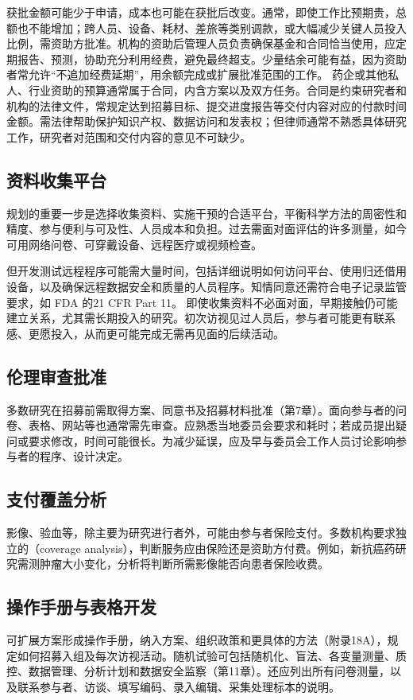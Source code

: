 获批金额可能少于申请，成本也可能在获批后改变。通常，即使工作比预期贵，总额也不能增加；跨人员、设备、耗材、差旅等类别调款，或大幅减少关键人员投入比例，需资助方批准。机构的资助后管理人员负责确保基金和合同恰当使用，应定期报告、预测，协助充分利用经费，避免最终超支。少量结余可能有益，因为资助者常允许“不追加经费延期”，用余额完成或扩展批准范围的工作。
药企或其他私人、行业资助的预算通常属于合同，内含方案以及双方任务。合同是约束研究者和机构的法律文件，常规定达到招募目标、提交进度报告等交付内容对应的付款时间金额。需法律帮助保护知识产权、数据访问和发表权；但律师通常不熟悉具体研究工作，研究者对范围和交付内容的意见不可缺少。

\subsection{资料收集平台}
规划的重要一步是选择收集资料、实施干预的合适平台，平衡科学方法的周密性和精度、参与便利与可及性、人员成本和负担。过去需面对面评估的许多测量，如今可用网络问卷、可穿戴设备、远程医疗或视频检查。

但开发测试远程程序可能需大量时间，包括详细说明如何访问平台、使用归还借用设备，以及确保远程数据安全和质量的人员程序。知情同意还需符合电子记录监管要求，如 FDA 的21 CFR Part 11。
即使收集资料不必面对面，早期接触仍可能建立关系，尤其需长期投入的研究。初次访视见过人员后，参与者可能更有联系感、更愿投入，从而更可能完成无需再见面的后续活动。

\subsection{伦理审查批准}
多数研究在招募前需取得方案、同意书及招募材料批准（第7章）。面向参与者的问卷、表格、网站等也通常需先审查。应熟悉当地委员会要求和耗时；若成员提出疑问或要求修改，时间可能很长。为减少延误，应及早与委员会工作人员讨论影响参与者的程序、设计决定。

\subsection{支付覆盖分析}
影像、验血等，除主要为研究进行者外，可能由参与者保险支付。多数机构要求独立的（coverage analysis），判断服务应由保险还是资助方付费。例如，新抗癌药研究需测肿瘤大小变化，分析将判断所需影像能否向患者保险收费。

\subsection{操作手册与表格开发}
可扩展方案形成操作手册，纳入方案、组织政策和更具体的方法（附录18A），规定如何招募入组及每次访视活动。随机试验可包括随机化、盲法、各变量测量、质控、数据管理、分析计划和数据安全监察（第11章）。还应列出所有问卷测量，以及联系参与者、访谈、填写编码、录入编辑、采集处理标本的说明。

